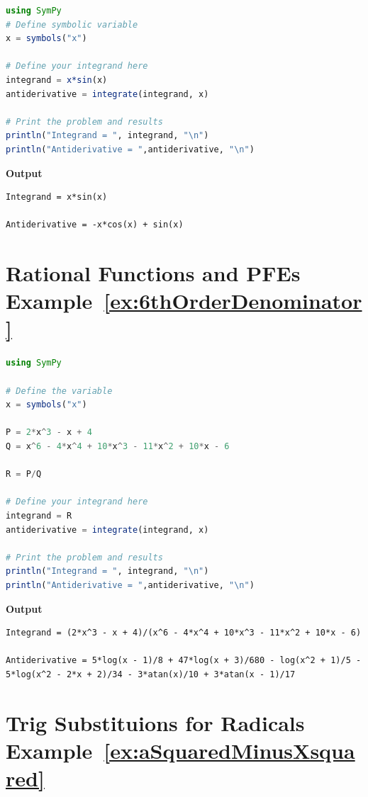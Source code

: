 \begin{lstlisting}[language=Julia,style=mystyle]
using SymPy
# Define symbolic variable
x = symbols("x")

# Define your integrand here
integrand = x*sin(x)
antiderivative = integrate(integrand, x)

# Print the problem and results
println("Integrand = ", integrand, "\n")
println("Antiderivative = ",antiderivative, "\n")
\end{lstlisting}
\textbf{Output} 
\begin{verbatim}
Integrand = x*sin(x)

Antiderivative = -x*cos(x) + sin(x)

\end{verbatim}

\section*{Rational Functions and PFEs Example~\ref{ex:6thOrderDenominator}}

\begin{lstlisting}[language=Julia,style=mystyle]
using SymPy

# Define the variable
x = symbols("x")

P = 2*x^3 - x + 4
Q = x^6 - 4*x^4 + 10*x^3 - 11*x^2 + 10*x - 6

R = P/Q

# Define your integrand here
integrand = R
antiderivative = integrate(integrand, x)

# Print the problem and results
println("Integrand = ", integrand, "\n")
println("Antiderivative = ",antiderivative, "\n")
\end{lstlisting}
\textbf{Output} 
\begin{verbatim}
Integrand = (2*x^3 - x + 4)/(x^6 - 4*x^4 + 10*x^3 - 11*x^2 + 10*x - 6)

Antiderivative = 5*log(x - 1)/8 + 47*log(x + 3)/680 - log(x^2 + 1)/5 - 5*log(x^2 - 2*x + 2)/34 - 3*atan(x)/10 + 3*atan(x - 1)/17
\end{verbatim}

\section*{Trig Substituions for Radicals Example~\ref{ex:aSquaredMinusXsquared}}

